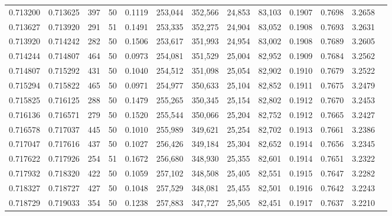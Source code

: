 \begin{tabular}{rrrrrrrrrrrrr}
0.713200 & 0.713625 &   397 &  50 &                                     0.1119 & 253,044 & 352,566 &  24,853 &  83,103 & 0.1907 & 0.7698 & 3.2658 \\
0.713627 & 0.713920 &   291 &  51 &                                     0.1491 & 253,335 & 352,275 &  24,904 &  83,052 & 0.1908 & 0.7693 & 3.2631 \\
0.713920 & 0.714242 &   282 &  50 &                                     0.1506 & 253,617 & 351,993 &  24,954 &  83,002 & 0.1908 & 0.7689 & 3.2605 \\
0.714244 & 0.714807 &   464 &  50 &                                     0.0973 & 254,081 & 351,529 &  25,004 &  82,952 & 0.1909 & 0.7684 & 3.2562 \\
0.714807 & 0.715292 &   431 &  50 &                                     0.1040 & 254,512 & 351,098 &  25,054 &  82,902 & 0.1910 & 0.7679 & 3.2522 \\
0.715294 & 0.715822 &   465 &  50 &                                     0.0971 & 254,977 & 350,633 &  25,104 &  82,852 & 0.1911 & 0.7675 & 3.2479 \\
0.715825 & 0.716125 &   288 &  50 &                                     0.1479 & 255,265 & 350,345 &  25,154 &  82,802 & 0.1912 & 0.7670 & 3.2453 \\
0.716136 & 0.716571 &   279 &  50 &                                     0.1520 & 255,544 & 350,066 &  25,204 &  82,752 & 0.1912 & 0.7665 & 3.2427 \\
0.716578 & 0.717037 &   445 &  50 &                                     0.1010 & 255,989 & 349,621 &  25,254 &  82,702 & 0.1913 & 0.7661 & 3.2386 \\
0.717047 & 0.717616 &   437 &  50 &                                     0.1027 & 256,426 & 349,184 &  25,304 &  82,652 & 0.1914 & 0.7656 & 3.2345 \\
0.717622 & 0.717926 &   254 &  51 &                                     0.1672 & 256,680 & 348,930 &  25,355 &  82,601 & 0.1914 & 0.7651 & 3.2322 \\
0.717932 & 0.718320 &   422 &  50 &                                     0.1059 & 257,102 & 348,508 &  25,405 &  82,551 & 0.1915 & 0.7647 & 3.2282 \\
0.718327 & 0.718727 &   427 &  50 &                                     0.1048 & 257,529 & 348,081 &  25,455 &  82,501 & 0.1916 & 0.7642 & 3.2243 \\
0.718729 & 0.719033 &   354 &  50 &                                     0.1238 & 257,883 & 347,727 &  25,505 &  82,451 & 0.1917 & 0.7637 & 3.2210 \\

\end{tabular}
